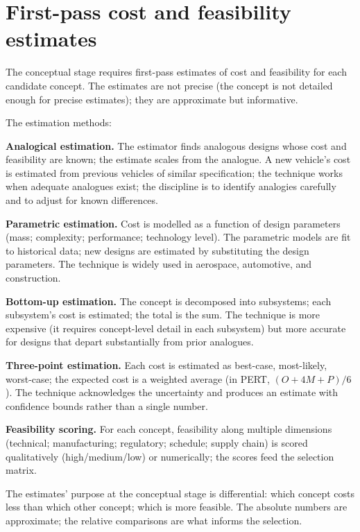 \section{First-pass cost and feasibility estimates}

The conceptual stage requires first-pass estimates of cost and feasibility for each candidate concept. The estimates are not precise (the concept is not detailed enough for precise estimates); they are approximate but informative.

The estimation methods:

\textbf{Analogical estimation.} The estimator finds analogous designs whose cost and feasibility are known; the estimate scales from the analogue. A new vehicle's cost is estimated from previous vehicles of similar specification; the technique works when adequate analogues exist; the discipline is to identify analogies carefully and to adjust for known differences.

\textbf{Parametric estimation.} Cost is modelled as a function of design parameters (mass; complexity; performance; technology level). The parametric models are fit to historical data; new designs are estimated by substituting the design parameters. The technique is widely used in aerospace, automotive, and construction.

\textbf{Bottom-up estimation.} The concept is decomposed into subsystems; each subsystem's cost is estimated; the total is the sum. The technique is more expensive (it requires concept-level detail in each subsystem) but more accurate for designs that depart substantially from prior analogues.

\textbf{Three-point estimation.} Each cost is estimated as best-case, most-likely, worst-case; the expected cost is a weighted average (in PERT, $(O + 4M + P)/6$). The technique acknowledges the uncertainty and produces an estimate with confidence bounds rather than a single number.

\textbf{Feasibility scoring.} For each concept, feasibility along multiple dimensions (technical; manufacturing; regulatory; schedule; supply chain) is scored qualitatively (high/medium/low) or numerically; the scores feed the selection matrix.

The estimates' purpose at the conceptual stage is differential: which concept costs less than which other concept; which is more feasible. The absolute numbers are approximate; the relative comparisons are what informs the selection.

